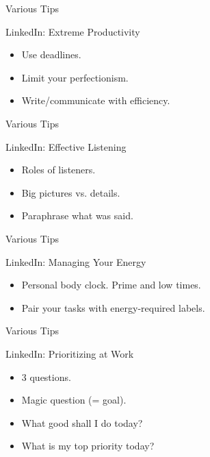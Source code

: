 \begin{frame}{Various Tips}
  \begin{block}{LinkedIn: Extreme Productivity}
    \begin{itemize}
      \item Use deadlines.
      \item Limit your perfectionism.
      \item Write/communicate with efficiency.
    \end{itemize}
  \end{block}
\end{frame}

\begin{frame}{Various Tips}
  \begin{block}{LinkedIn: Effective Listening}
    \begin{itemize}
      \item Roles of listeners. %
      \item Big pictures vs. details.
      \item Paraphrase what was said. %
    \end{itemize}
  \end{block}
\end{frame}

\begin{frame}{Various Tips}
  \begin{block}{LinkedIn: Managing Your Energy}
    \begin{itemize}
      \item Personal body clock. Prime and low times.
      \item Pair your tasks with energy-required labels. 
    \end{itemize}
  \end{block}
\end{frame}

\begin{frame}{Various Tips}
  \begin{block}{LinkedIn: Prioritizing at Work}
    \begin{itemize}
      \item 3 questions.
      \item Magic question (= goal).
      \item What good shall I do today?
      \item What is my top priority today?
    \end{itemize}
  \end{block}
\end{frame}

